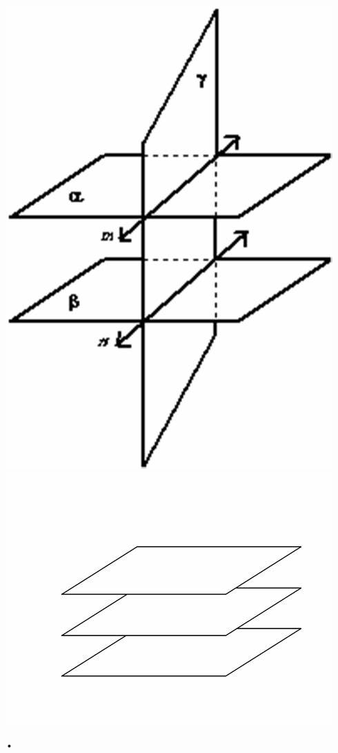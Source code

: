 \documentclass[a4paper, 11pt]{article}
\begin{document}
\begin{enumerate}
	\begin{center}
		\includegraphics[width=\linewidth]{images/no_solution_plane_2.jpg}
	\includegraphics[width=\linewidth]{images/no_solution_plane.jpg}
\end{center}•



\end{enumerate}
\end{document}
